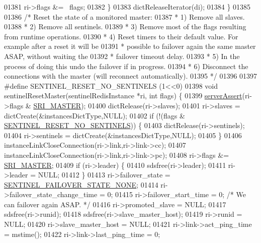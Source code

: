 \begin{DoxyCode}
{{{{{{{{{{{{{{{{01381         ri->flags &= ~flags;
01382     \}
01383     dictReleaseIterator(di);
01384 \}
01385 
01386 \textcolor{comment}{/* Reset the state of a monitored master:}
01387 \textcolor{comment}{ * 1) Remove all slaves.}
01388 \textcolor{comment}{ * 2) Remove all sentinels.}
01389 \textcolor{comment}{ * 3) Remove most of the flags resulting from runtime operations.}
01390 \textcolor{comment}{ * 4) Reset timers to their default value. For example after a reset it will be}
01391 \textcolor{comment}{ *    possible to failover again the same master ASAP, without waiting the}
01392 \textcolor{comment}{ *    failover timeout delay.}
01393 \textcolor{comment}{ * 5) In the process of doing this undo the failover if in progress.}
01394 \textcolor{comment}{ * 6) Disconnect the connections with the master (will reconnect automatically).}
01395 \textcolor{comment}{ */}
01396 
01397 \textcolor{preprocessor}{#}\textcolor{preprocessor}{define} \textcolor{preprocessor}{SENTINEL\_RESET\_NO\_SENTINELS} \textcolor{preprocessor}{(}1\textcolor{preprocessor}{<<}0\textcolor{preprocessor}{)}
01398 \textcolor{keywordtype}{void} sentinelResetMaster(sentinelRedisInstance *ri, \textcolor{keywordtype}{int} flags) \{
01399     \hyperlink{server_8h_a88114b5169b4c382df6b56506285e56a}{serverAssert}(ri->flags & \hyperlink{sentinel_8c_a2ee83e5ff67b45746cd6a310f15334b2}{SRI\_MASTER});
01400     dictRelease(ri->slaves);
01401     ri->slaves = dictCreate(&instancesDictType,NULL);
01402     \textcolor{keywordflow}{if} (!(flags & \hyperlink{sentinel_8c_a7cb0584b0d2fb56e4bca40b6776ae9d6}{SENTINEL\_RESET\_NO\_SENTINELS})) \{
01403         dictRelease(ri->sentinels);
01404         ri->sentinels = dictCreate(&instancesDictType,NULL);
01405     \}
01406     instanceLinkCloseConnection(ri->link,ri->link->cc);
01407     instanceLinkCloseConnection(ri->link,ri->link->pc);
01408     ri->flags &= \hyperlink{sentinel_8c_a2ee83e5ff67b45746cd6a310f15334b2}{SRI\_MASTER};
01409     \textcolor{keywordflow}{if} (ri->leader) \{
01410         sdsfree(ri->leader);
01411         ri->leader = NULL;
01412     \}
01413     ri->failover\_state = \hyperlink{sentinel_8c_a23bad5aa23e7b1a930ad4aa535938efb}{SENTINEL\_FAILOVER\_STATE\_NONE};
01414     ri->failover\_state\_change\_time = 0;
01415     ri->failover\_start\_time = 0; \textcolor{comment}{/* We can failover again ASAP. */}
01416     ri->promoted\_slave = NULL;
01417     sdsfree(ri->runid);
01418     sdsfree(ri->slave\_master\_host);
01419     ri->runid = NULL;
01420     ri->slave\_master\_host = NULL;
01421     ri->link->act\_ping\_time = mstime();
01422     ri->link->last\_ping\_time = 0;
}}}}}}}}}}}}}}}}
\end{DoxyCode}
